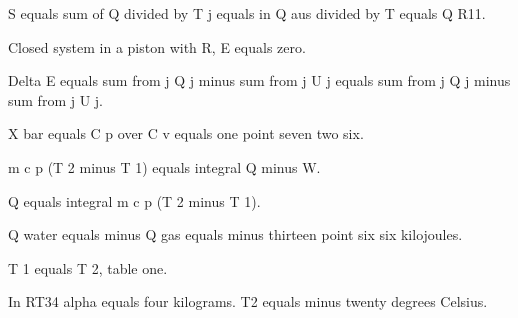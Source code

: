 S equals sum of Q divided by T j equals in Q aus divided by T equals Q R11.

Closed system in a piston with R, E equals zero.

Delta E equals sum from j Q j minus sum from j U j equals sum from j Q j minus sum from j U j.

X bar equals C p over C v equals one point seven two six.

m c p (T 2 minus T 1) equals integral Q minus W.

Q equals integral m c p (T 2 minus T 1).

Q water equals minus Q gas equals minus thirteen point six six kilojoules.

T 1 equals T 2, table one.

In RT34 alpha equals four kilograms. T2 equals minus twenty degrees Celsius.